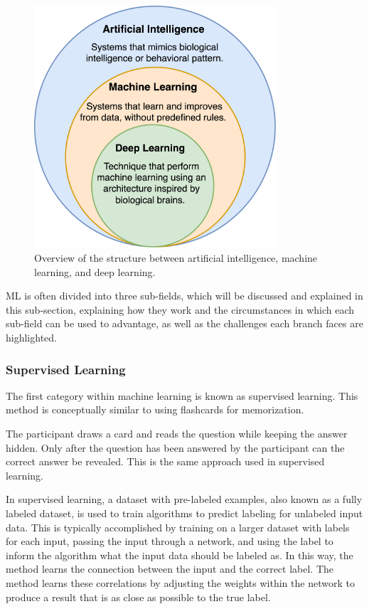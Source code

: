     \begin{figure}[htb]
        \centering
        \includegraphics[width=9cm]{images/ai_ml_dnn.png}
        \caption{Overview of the structure between artificial intelligence, machine learning, and deep learning.}
        \label{fig:ai_ml_dnn}
    \end{figure} 

    ML is often divided into three sub-fields, which will be discussed and explained in this sub-section, explaining how they work and the circumstances in which each sub-field can be used to advantage, as well as the challenges each branch faces are highlighted.

        \subsubsection{Supervised Learning}

        The first category within machine learning is known as supervised learning. This method is conceptually similar to using flashcards for memorization.

        The participant draws a card and reads the question while keeping the answer hidden. Only after the question has been answered by the participant can the correct answer be revealed. This is the same approach used in supervised learning.
        
        
        In supervised learning, a dataset with pre-labeled examples, also known as a fully labeled dataset, is used to train algorithms to predict labeling for unlabeled input data. This is typically accomplished by training on a larger dataset with labels for each input, passing the input through a network, and using the label to inform the algorithm what the input data should be labeled as. In this way, the method learns the connection between the input and the correct label. The method learns these correlations by adjusting the weights within the network to produce a result that is as close as possible to the true label.
        
